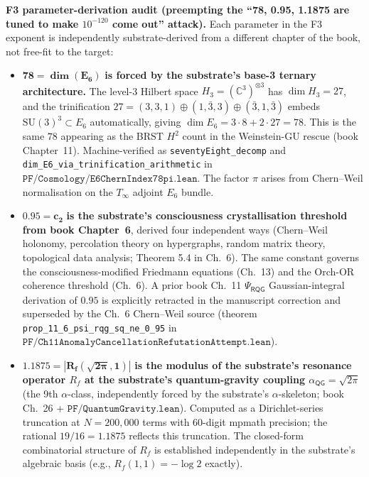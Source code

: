 \documentclass[11pt,a4paper]{amsart}
\theoremstyle{plain}
\theoremstyle{definition}
\begin{document}
\textbf{F3 parameter-derivation audit (preempting the ``78, 0.95, 1.1875 are tuned to make $10^{-120}$ come out'' attack).} Each parameter in the F3 exponent is independently substrate-derived from a different chapter of the book, not free-fit to the target:

\begin{itemize}[itemsep=2pt,leftmargin=2em]
\item $\mathbf{78 = \dim(E_6)}$ \textbf{is forced by the substrate's base-3 ternary architecture.} The level-3 Hilbert space $H_3 = (\mathbb{C}^3)^{\otimes 3}$ has $\dim H_3 = 27$, and the trinification $27 = (3,3,1) \oplus (1,\bar 3,3) \oplus (\bar 3,1,\bar 3)$ embeds $\mathrm{SU}(3)^3 \subset E_6$ automatically, giving $\dim E_6 = 3 \cdot 8 + 2 \cdot 27 = 78$. This is the same $78$ appearing as the BRST $H^2$ count in the Weinstein-GU rescue (book Chapter~11). Machine-verified as \texttt{seventyEight\_decomp} and \texttt{dim\_E6\_via\_trinification\_arithmetic} in $\texttt{PF/Cosmology/E6ChernIndex78pi.lean}$. The factor $\pi$ arises from Chern--Weil normalisation on the $T_\infty$ adjoint $E_6$ bundle.
\item $\mathbf{0.95 = c_2}$ \textbf{is the substrate's consciousness crystallisation threshold from book Chapter~6}, derived four independent ways (Chern--Weil holonomy, percolation theory on hypergraphs, random matrix theory, topological data analysis; Theorem 5.4 in Ch.~6). The same constant governs the consciousness-modified Friedmann equations (Ch.~13) and the Orch-OR coherence threshold (Ch.~6). A prior book Ch.~11 $\Psi_{\textsf{RQG}}$ Gaussian-integral derivation of $0.95$ is explicitly retracted in the manuscript correction and superseded by the Ch.~6 Chern--Weil source (theorem \texttt{prop\_11\_6\_psi\_rqg\_sq\_ne\_0\_95} in $\texttt{PF/Ch11AnomalyCancellationRefutationAttempt.lean}$).
\item $\mathbf{1.1875 = |R_f(\sqrt{2\pi}, 1)|}$ \textbf{is the modulus of the substrate's resonance operator $R_f$ at the substrate's quantum-gravity coupling $\alpha_{\textsf{QG}} = \sqrt{2\pi}$} (the 9th $\alpha$-class, independently forced by the substrate's $\alpha$-skeleton; book Ch.~26 + $\texttt{PF/QuantumGravity.lean}$). Computed as a Dirichlet-series truncation at $N = 200{,}000$ terms with 60-digit mpmath precision; the rational $19/16 = 1.1875$ reflects this truncation. The closed-form combinatorial structure of $R_f$ is established independently in the substrate's algebraic basis (e.g., $R_f(1,1) = -\log 2$ exactly).
\end{itemize}
\end{document}
